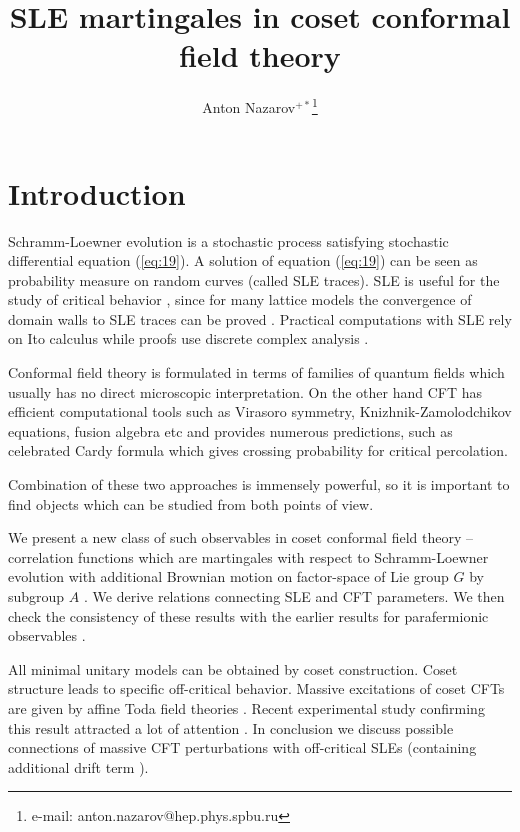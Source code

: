 \documentclass{jetpl}
\title{SLE martingales in coset conformal field theory}
\author{Anton Nazarov$^{+*}$\/\thanks{e-mail: anton.nazarov@hep.phys.spbu.ru}}
\begin{document}
\maketitle

\section{Introduction}
\label{sec:introduction}

Schramm-Loewner evolution \cite{schramm2000scaling} is a stochastic process satisfying stochastic differential equation (\ref{eq:19}). A solution of  equation (\ref{eq:19}) can be seen as  probability measure on random curves (called SLE traces). SLE is useful for the study of critical behavior \cite{Cardy:2005kh,rohde2005basic}, since for many lattice models the convergence of  domain walls to SLE traces can be proved \cite{bauer20062d,schramm2006conformally}. Practical computations with SLE rely on Ito calculus while proofs use discrete complex analysis \cite{duminil2011conformal}.

Conformal field theory \cite{belavin1984ics} is formulated in terms of families of quantum fields which usually has no direct microscopic interpretation. On the other hand CFT has efficient computational tools such as Virasoro symmetry, Knizhnik-Zamolodchikov equations, fusion algebra etc and provides numerous predictions, such as celebrated Cardy formula \cite{cardy1992critical,smirnov2001critical} which gives crossing probability for critical percolation. 

Combination of these two approaches is immensely powerful, so it is important to find objects which can be studied from both points of view.

We present a new class of such observables in coset conformal field theory  -- correlation functions which are martingales with respect to Schramm-Loewner evolution with additional Brownian motion on factor-space of Lie group $G$ by subgroup $A$ \cite{2011arXiv1112.4354N}. We derive relations connecting SLE and CFT parameters. We then check the consistency of these results with the earlier results  for parafermionic observables \cite{santachiara2008sle}. 

All minimal unitary models can be obtained by coset construction. Coset structure leads to specific off-critical behavior. Massive excitations of coset CFTs are given by affine Toda field theories \cite{fateev1990conformal,eguchi1989deformations,hollowood1989rational}. Recent experimental study confirming this result attracted a lot of attention \cite{coldea2010quantum}. In conclusion we discuss possible connections of massive CFT perturbations with  off-critical SLEs (containing additional drift term  \cite{makarov2010off}).
\end{document}
